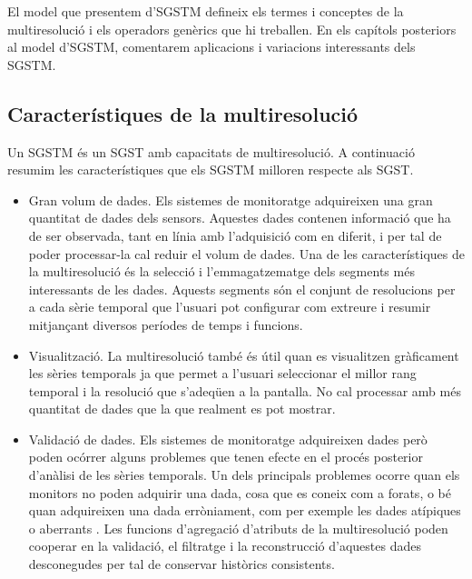 El model que presentem d'\gls{SGSTM} defineix els termes i conceptes
de la multiresolució i els operadors genèrics que hi treballen. En els
capítols posteriors al model d'\gls{SGSTM}, comentarem aplicacions i variacions interessants dels \gls{SGSTM}.






\subsection{Característiques de la multiresolució}

Un \gls{SGSTM} és un \gls{SGST} amb capacitats de multiresolució.  A
continuació resumim les característiques que els \gls{SGSTM} milloren
respecte als \gls{SGST}.

\begin{itemize}

\item Gran volum de dades. Els sistemes de monitoratge adquireixen una
  gran quantitat de dades dels sensors. Aquestes dades contenen
  informació que ha de ser observada, tant en línia amb l'adquisició
  com en diferit, i per tal de poder processar-la cal reduir el volum
  de dades. Una de les característiques de la multiresolució és la
  selecció i l'emmagatzematge dels segments més interessants de les
  dades. Aquests segments són el conjunt de resolucions per a cada
  sèrie temporal que l'usuari pot configurar com extreure i resumir
  mitjançant diversos períodes de temps i funcions.

\item Visualització. La multiresolució també és útil quan es
  visualitzen gràficament les sèries temporals ja que permet a
  l'usuari seleccionar el millor rang temporal i la resolució que
  s'adeqüen a la pantalla. No cal processar amb més quantitat de dades que
  la que realment es pot mostrar.


\item Validació de dades. Els sistemes de monitoratge adquireixen
  dades però poden ocórrer alguns problemes que tenen efecte en el
  procés posterior d'anàlisi de les sèries temporals. Un dels
  principals problemes ocorre quan els monitors no poden adquirir una
  dada, cosa que es coneix com a forats, o bé quan adquireixen una
  dada erròniament, com per exemple les dades atípiques o
  aberrants \parencite{quevedo10}.  Les funcions d'agregació
  d'atributs de la multiresolució poden cooperar en la validació, el
  filtratge i la reconstrucció d'aquestes dades desconegudes per tal
  de conservar històrics consistents.


\end{itemize}
